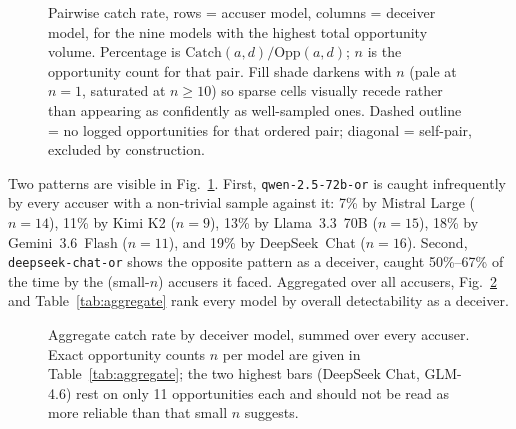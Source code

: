 \documentclass[10pt,conference]{IEEEtran}
\begin{document}
\begin{figure}[t]
{
}
\caption{Pairwise catch rate, rows = accuser model, columns = deceiver model, for the nine models with the highest total opportunity volume. Percentage is $\mathrm{Catch}(a,d)/\mathrm{Opp}(a,d)$; $n$ is the opportunity count for that pair. Fill shade darkens with $n$ (pale at $n{=}1$, saturated at $n{\geq}10$) so sparse cells visually recede rather than appearing as confidently as well-sampled ones. Dashed outline = no logged opportunities for that ordered pair; diagonal = self-pair, excluded by construction.}
\label{fig:heatmap}
\end{figure}

Two patterns are visible in Fig.~\ref{fig:heatmap}. First, \texttt{qwen-2.5-72b-or} is caught infrequently by every accuser with a non-trivial sample against it: 7\% by Mistral Large ($n{=}14$), 11\% by Kimi K2 ($n{=}9$), 13\% by Llama~3.3~70B ($n{=}15$), 18\% by Gemini~3.6~Flash ($n{=}11$), and 19\% by DeepSeek~Chat ($n{=}16$). Second, \texttt{deepseek-chat-or} shows the opposite pattern as a deceiver, caught 50\%--67\% of the time by the (small-$n$) accusers it faced. Aggregated over all accusers, Fig.~\ref{fig:barchart} and Table~\ref{tab:aggregate} rank every model by overall detectability as a deceiver.

\begin{figure}[t]
\centering
{}
\caption{Aggregate catch rate by deceiver model, summed over every accuser. Exact opportunity counts $n$ per model are given in Table~\ref{tab:aggregate}; the two highest bars (DeepSeek Chat, GLM-4.6) rest on only 11 opportunities each and should not be read as more reliable than that small $n$ suggests.}
\label{fig:barchart}
\end{figure}
\end{document}
